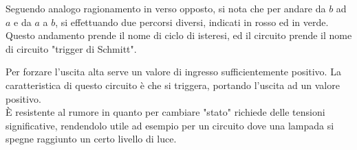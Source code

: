 \documentclass[../template]{subfiles}
\begin{document}
\begin{center}
    \centering
\end{center}

Seguendo analogo ragionamento in verso opposto, si nota che per andare da $b$ ad $a$ e da $a$ a $b$, si effettuando due percorsi diversi, indicati in rosso ed in verde.
\\
Questo andamento prende il nome di ciclo di isteresi, ed il circuito prende il nome di circuito "trigger di Schmitt".

Per forzare l'uscita alta serve un valore di ingresso sufficientemente positivo.
La caratteristica di questo circuito è che si triggera, portando l'uscita ad un valore positivo.
\\
È resistente al rumore in quanto per cambiare "stato" richiede delle tensioni significative, rendendolo utile ad esempio
per un circuito dove una lampada si spegne raggiunto un certo livello di luce.
\end{document}

